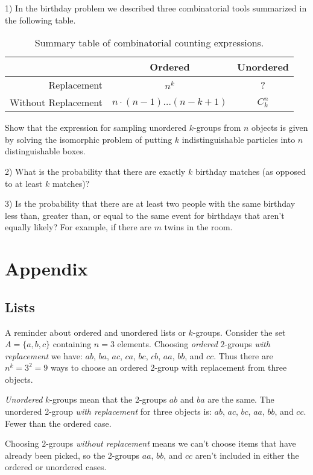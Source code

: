 \documentclass[11pt,a4paper]{article}
\begin{document}
1) In the birthday problem we described three combinatorial 
tools summarized in the following table.

\begin{table}[h!]
\centering
\begin{tabular}{| r | c | c |}
\hline
 & Ordered & Unordered \\\hline
Replacement & \(n^{k}\) & ? \\\hline
Without Replacement  & \(n\cdot (n-1) \ldots (n-k+1)\) & \(C_{k}^{n}\) \\\hline
\end{tabular}
\caption{%
Summary table of combinatorial counting expressions.
}
\end{table}

Show that the expression for sampling unordered \(k\)-groups from \(n\) objects is 
given by solving the isomorphic problem of putting \(k\) indistinguishable particles 
into \(n\) distinguishable boxes.

2) What is the probability that there are exactly \(k\) birthday matches (as opposed to at least \(k\) matches)?

3) Is the probability that there are at least two people with the same birthday less than, 
greater than, 
or equal to the same event for birthdays that aren't equally likely? 
For example, 
if there are \(m\) twins in the room.

\section{Appendix}

\subsection{Lists}

A reminder about ordered and unordered lists or \(k\)-groups. 
Consider the set \(A = \{a,b,c\}\) containing \(n=3\) elements.
Choosing \emph{ordered} \(2\)-groups \emph{with replacement} we have: 
\(ab\), \(ba\), \(ac\), \(ca\), \(bc\), \(cb\), \(aa\), \(bb\), and \(cc\). 
Thus there are \(n^{k} = 3^2 = 9\) ways to choose an ordered 2-group 
with replacement from three objects.

\emph{Unordered} \(k\)-groups mean that the 2-groups \(ab\) and \(ba\) are the same. 
The unordered 2-group \emph{with replacement} for three objects is: 
\(ab\), \(ac\), \(bc\), \(aa\), \(bb\), and \(cc\).
Fewer than the ordered case.

Choosing \(2\)-groups \emph{without replacement} means we can't choose items
that have already been picked, 
so the 2-groups \(aa\), \(bb\), and \(cc\) aren't included in either the ordered or unordered cases.
\end{document}
